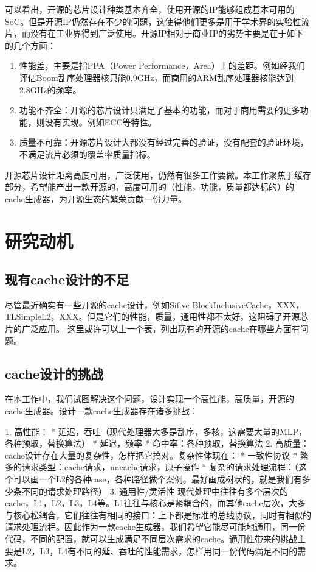 可以看出，开源的芯片设计种类基本齐全，使用开源的IP能够组成基本可用的SoC。但是开源IP仍然存在不少的问题，这使得他们更多是用于学术界的实验性流片，而没有在工业界得到广泛使用。开源IP相对于商业IP的劣势主要是在于如下的几个方面：

\begin{enumerate}
	\item 性能差，主要是指PPA（Power Performance，Area）上的差距。例如经我们评估Boom乱序处理器核只能0.9GHz，而商用的ARM乱序处理器核能达到2.8GHz的频率。
	\item 功能不齐全：开源的芯片设计只满足了基本的功能，而对于商用需要的更多功能，则没有实现。例如ECC等特性。
	\item 质量不可靠：开源芯片设计大都没有经过完善的验证，没有配套的验证环境，不满足流片必须的覆盖率质量指标。
\end{enumerate}

开源芯片设计距离高度可用，广泛使用，仍然有很多工作要做。本工作聚焦于缓存部分，希望能产出一款开源的，高度可用的（性能，功能，质量都达标的）的cache生成器，为开源生态的繁荣贡献一份力量。

\section{研究动机}

\subsection{现有cache设计的不足}


尽管最近确实有一些开源的cache设计，例如Sifive BlockInclusiveCache，XXX，TLSimpleL2，XXX。但是它们的性能，质量，通用性都不太好。这阻碍了开源芯片的广泛应用。
这里或许可以上一个表，列出现有的开源的cache在哪些方面有问题。

\subsection{cache设计的挑战}

在本工作中，我们试图解决这个问题，设计实现一个高性能，高质量，开源的cache生成器。设计一款cache生成器存在诸多挑战：

1. 高性能：
  * 延迟，吞吐（现代处理器大多是乱序，多核，这需要大量的MLP，各种预取，替换算法）
  * 延迟，频率
  * 命中率：各种预取，替换算法
2. 高质量：
  cache设计存在大量的复杂性，怎样把它搞对。复杂性体现在：
  * 一致性协议
  * 繁多的请求类型：cache请求，uncache请求，原子操作
  * 复杂的请求处理流程：（这个可以画一个L2的各种case，各种路径做个案例。最好画成树状的，就是我们有多少条不同的请求处理路径）
3. 通用性/灵活性
  现代处理中往往有多个层次的cache，L1，L2，L3，L4等。L1往往与核心是紧耦合的，而其他cache层次，大多与核心松耦合，它们往往有相同的接口：上下都是标准的总线协议，同时有相似的请求处理流程。因此作为一款cache生成器，我们希望它能尽可能地通用，同一份代码，不同的配置，就可以生成满足不同层次需求的cache。通用性带来的挑战主要是L2，L3，L4有不同的延、吞吐的性能需求，怎样用同一份代码满足不同的需求。

